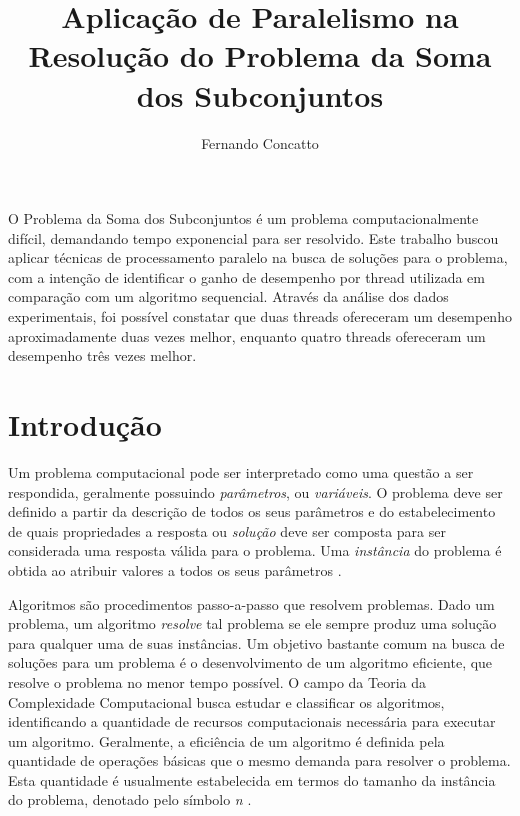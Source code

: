 \documentclass[12pt]{article}
\title{Aplicação de Paralelismo na Resolução do Problema da Soma dos Subconjuntos}
\author{Fernando Concatto\inst{1}}
\begin{document}
\maketitle

\begin{resumo}
  O Problema da Soma dos Subconjuntos é um problema computacionalmente difícil, demandando tempo exponencial para ser resolvido. Este trabalho buscou aplicar técnicas de processamento paralelo na busca de soluções para o problema, com a intenção de identificar o ganho de desempenho por thread utilizada em comparação com um algoritmo sequencial. Através da análise dos dados experimentais, foi possível constatar que duas threads ofereceram um desempenho aproximadamente duas vezes melhor, enquanto quatro threads ofereceram um desempenho três vezes melhor.
\end{resumo}


\section{Introdução} \label{sec:intro}

Um problema computacional pode ser interpretado como uma questão a ser respondida, geralmente possuindo \textit{parâmetros}, ou \textit{variáveis}. O problema deve ser definido a partir da descrição de todos os seus parâmetros e do estabelecimento de quais propriedades a resposta ou \textit{solução} deve ser composta para ser considerada uma resposta válida para o problema. Uma \textit{instância} do problema é obtida ao atribuir valores a todos os seus parâmetros \cite{Garey1979}.

Algoritmos são procedimentos passo-a-passo que resolvem problemas. Dado um problema, um algoritmo \textit{resolve} tal problema se ele sempre produz uma solução para qualquer uma de suas instâncias. Um objetivo bastante comum na busca de soluções para um problema é o desenvolvimento de um algoritmo eficiente, que resolve o problema no menor tempo possível. O campo da Teoria da Complexidade Computacional busca estudar e classificar os algoritmos, identificando a quantidade de recursos computacionais necessária para executar um algoritmo. Geralmente, a eficiência de um algoritmo é definida pela quantidade de operações básicas que o mesmo demanda para resolver o problema. Esta quantidade é usualmente estabelecida em termos do tamanho da instância do problema, denotado pelo símbolo \textit{n} \cite{Arora2009,Garey1979}.
\end{document}
